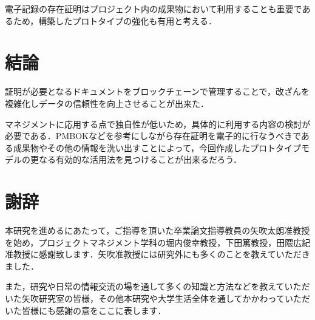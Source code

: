電子記録の存在証明はプロジェクト内の成果物において利用することも重要であるため，構築したプロトタイプの強化も有用と考える．

\chapter{結論}

証明が必要となるドキュメントをブロックチェーンで管理することで，改ざんを複雑化しデータの信頼性を向上させることが出来た．

マネジメントに応用する点で独自性が低いため，具体的に利用する内容の検討が必要である．PMBOKなどを参考にしながら存在証明を電子的に行なうべきである成果物やその他の情報を洗い出すことによって，今回作成したプロトタイプモデルの更なる有効的な活用法を見つけることが出来るだろう．



\chapter*{謝辞}

本研究を進めるにあたって，ご指導を頂いた卒業論文指導教員の矢吹太朗准教授を始め，プロジェクトマネジメント学科の堀内俊幸教授，下田篤教授，田隈広紀准教授に感謝致します．矢吹准教授には研究外にも多くのことを教えていただきました．

また，研究や日常の情報交流の場を通して多くの知識と方法などを教えていただいた矢吹研究室の皆様，その他本研究や大学生活全体を通してかかわっていただいた皆様にも感謝の意をここに表します．


